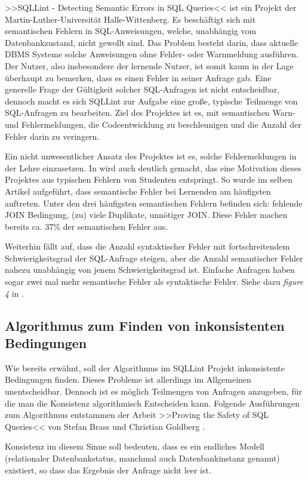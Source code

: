 >>SQLLint - Detecting Semantic Errors in SQL Queries<< ist ein Projekt der Martin-Luther-Universität Halle-Wittenberg. Es beschäftigt sich mit semantischen Fehlern in SQL-Anweisungen, welche, unabhängig vom Datenbankzustand, nicht gewollt sind. Das Problem besteht darin, dass aktuelle DBMS Systeme solche Anweisungen ohne Fehler- oder Warnmeldung ausführen. Der Nutzer, also insbesondere der lernende Nutzer, ist somit kaum in der Lage überhaupt zu bemerken, dass es einen Fehler in seiner Anfrage gab. Eine generelle Frage der Gültigkeit solcher SQL-Anfragen ist nicht entscheidbar, dennoch macht es sich SQLLint zur Aufgabe eine große, typische Teilmenge von SQL-Anfragen zu bearbeiten. Ziel des Projektes ist es, mit semantischen Warn- und Fehlermeldungen, die Codeentwicklung zu beschleunigen und die Anzahl der Fehler darin zu veringern.

Ein nicht unwesentlicher Ansatz des Projektes ist es, solche Fehlermeldungen in der Lehre einzusetzen. In \cite{sqllint1} wird auch deutlich gemacht, das eine Motivation dieses Projektes aus typischen Fehlern von Studenten entspringt. So wurde im selben Artikel aufgeführt, dass semantische Fehler bei Lernenden am häufigsten auftreten. Unter den drei häufigsten semantischen Fehlern befinden sich: fehlende JOIN Bedingung, (zu) viele Duplikate, unnötiger JOIN. Diese Fehler machen bereits ca. 37\% der semantischen Fehler aus.

Weiterhin fällt auf, dass die Anzahl syntaktischer Fehler mit fortschreitendem Schwierigkeitsgrad der SQL-Anfrage steigen, aber die Anzahl semantischer Fehler nahezu unabhängig von jenem Schwierigkeitsgrad ist. Einfache Anfragen haben sogar zwei mal mehr semantische Fehler als syntaktische Fehler. Siehe dazu \emph{figure 4} in \cite{sqllint1}.

\subsection{Algorithmus zum Finden von inkonsistenten Bedingungen}

Wie bereits erwähnt, soll der Algorithmus im SQLLint Projekt inkonsistente Bedingungen finden. Dieses Probleme ist allerdings im Allgemeinen unentscheidbar. Dennoch ist es möglich Teilmengen von Anfragen anzugeben, für die man die Konsistenz algorithmisch Entscheiden kann. Folgende Ausführungen zum Algorithmus entstammen der Arbeit >>Proving the Safety of SQL Queries<< von Stefan Brass und Christian Goldberg \cite{brass1}.

Konsistenz im diesem Sinne soll bedeuten, dass es ein endliches Modell (relationaler Datenbankstatus, manchmal auch Datenbankinstanz genannt) existiert, so dass das Ergebnis der Anfrage nicht leer ist.

